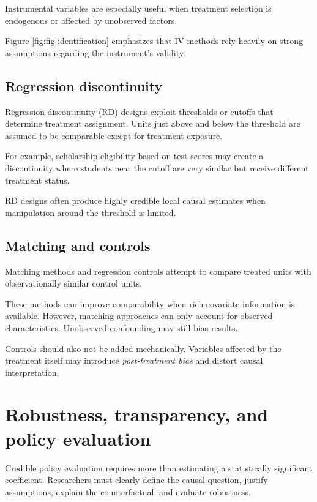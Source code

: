 \documentclass[
  11pt,
  oneside]{book}
\begin{document}
Instrumental variables are especially useful when treatment selection is endogenous or affected by unobserved factors.

Figure \ref{fig:fig-identification} emphasizes that IV methods rely heavily on strong assumptions regarding the instrument's validity.

\subsection{Regression discontinuity}\label{regression-discontinuity}

Regression discontinuity (RD) designs exploit thresholds or cutoffs that determine treatment assignment. Units just above and below the threshold are assumed to be comparable except for treatment exposure.

For example, scholarship eligibility based on test scores may create a discontinuity where students near the cutoff are very similar but receive different treatment status.

RD designs often produce highly credible local causal estimates when manipulation around the threshold is limited.

\subsection{Matching and controls}\label{matching-and-controls}

Matching methods and regression controls attempt to compare treated units with observationally similar control units.

These methods can improve comparability when rich covariate information is available. However, matching approaches can only account for observed characteristics. Unobserved confounding may still bias results.

Controls should also not be added mechanically. Variables affected by the treatment itself may introduce \emph{post-treatment bias} and distort causal interpretation.

\section{Robustness, transparency, and policy evaluation}\label{robustness-transparency-and-policy-evaluation}

Credible policy evaluation requires more than estimating a statistically significant coefficient. Researchers must clearly define the causal question, justify assumptions, explain the counterfactual, and evaluate robustness.
\end{document}
